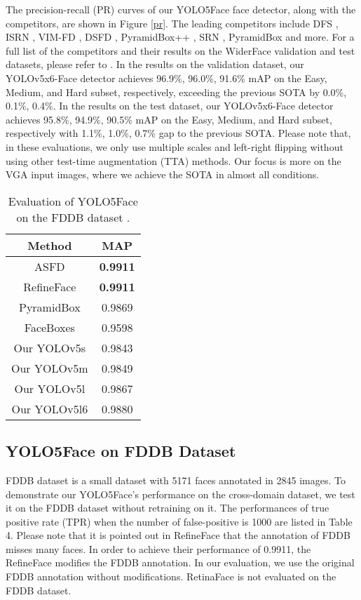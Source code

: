 \documentclass[conference]{IEEEtran}
\begin{document}
The precision-recall (PR) curves of our YOLO5Face face detector, along with the competitors, are shown in Figure \ref{pr}. The leading competitors include DFS \cite{DFS}, ISRN \cite{ISRN}, VIM-FD \cite{VIM-FD}, DSFD \cite{DSFD}, PyramidBox++ \cite{PyramidBox++}, SRN \cite{SRN}, PyramidBox \cite{PyramidBox} and more. For a full list of the competitors and their results on the WiderFace \cite{WiderFace} validation and test datasets, please refer to \cite{WiderFaceWeb}. In the results on the validation dataset, our YOLOv5x6-Face detector achieves 96.9\%, 96.0\%, 91.6\% mAP on the Easy, Medium, and Hard subset, respectively, exceeding the previous SOTA by 0.0\%, 0.1\%, 0.4\%. In the results on the test dataset, our YOLOv5x6-Face detector achieves 95.8\%, 94.9\%, 90.5\% mAP on the Easy, Medium, and Hard subset, respectively with 1.1\%, 1.0\%, 0.7\% gap to the previous SOTA. Please note that, in these evaluations, we only use multiple scales and left-right flipping without using other test-time augmentation (TTA) methods. Our focus is more on the VGA input images, where we achieve the SOTA in almost all conditions. 

\begin{table}[tb]
    \centering
    \begin{tabular}{c|c}
        \hline
        Method & MAP  \\
        \hline
        ASFD \cite{ASFD} & \textbf{0.9911} \\
        RefineFace \cite{RefineFace} & \textbf{0.9911} \\  
        PyramidBox \cite{PyramidBox} & 0.9869 \\
        FaceBoxes \cite{FaceBox} & 0.9598 \\ 
        Our YOLOv5s & 0.9843 \\
        Our YOLOv5m & 0.9849 \\
        Our YOLOv5l & 0.9867 \\
        Our YOLOv5l6 & 0.9880 \\
        \hline
    \end{tabular}
    \caption{Evaluation of YOLO5Face on the FDDB dataset \cite{fddb}.}
    \label{t4}
\end{table}

\subsection{YOLO5Face on FDDB Dataset}
FDDB dataset \cite{fddb} is a small dataset with 5171 faces annotated in 2845 images. To demonstrate our YOLO5Face's performance on the cross-domain dataset, we test it on the FDDB dataset without retraining on it. The performances of true positive rate (TPR) when the number of false-positive is 1000 are listed in Table 4. Please note that it is pointed out in RefineFace \cite{RefineFace} that the annotation of FDDB misses many faces. In order to achieve their performance of 0.9911, the RefineFace modifies the FDDB annotation. In our evaluation, we use the original FDDB annotation without modifications. RetinaFace \cite{RetinaFace} is not evaluated on the FDDB dataset.        
\end{document}
